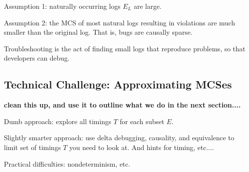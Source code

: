 Assumption 1: naturally occurring  logs $E_L$ are large.

Assumption 2: the MCS of most natural logs resulting in violations are much smaller than the original log.  That is, bugs are causally sparse.

Troubleshooting is the act of finding small logs that reproduce problems, so that developers can debug.

\subsection{Technical Challenge: Approximating MCSes}

{\bf clean this up, and use it to outline what we do in the next section....}

\begin{outline}
\1 Dumb approach: explore all timings $T$ for each subset $E$.

\1 Slightly smarter approach: use delta debugging, causality, and equivalence to limit set of timings $T$ you need to look at.  And hints for timing, etc....

\1 Practical difficulties: nondeterminism, etc.
\end{outline}
